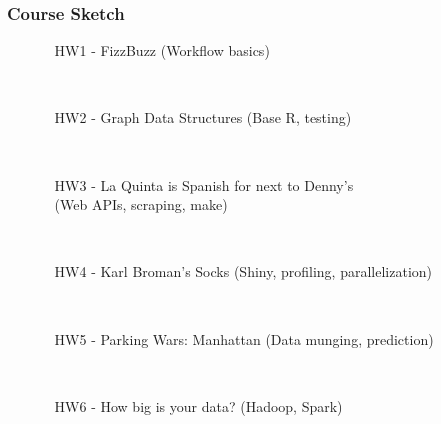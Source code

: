 \documentclass[12pt]{beamer}
\begin{document}
\begin{frame}[t]
\frametitle{Course Sketch}

\begin{enumerate}

\item[]
    
\begin{enumerate}

\item[\qquad HW1 - ] FizzBuzz {\scriptsize(Workflow basics)}

~\\

\item[\qquad HW2 - ] Graph Data Structures {\scriptsize(Base R, testing)}

~\\

\item[\qquad HW3 - ] La Quinta is Spanish for next to Denny's \\ {\scriptsize(Web APIs, scraping, make)}

~\\

\item[\qquad HW4 - ] Karl Broman's Socks {\scriptsize(Shiny, profiling, parallelization)}

~\\

\item[\qquad HW5 - ] Parking Wars: Manhattan {\scriptsize(Data munging, prediction)}

~\\

\item[\qquad HW6 - ] How big is your data? {\scriptsize(Hadoop, Spark)}

\end{enumerate}

\end{enumerate}
    
\end{frame}

\end{document}
